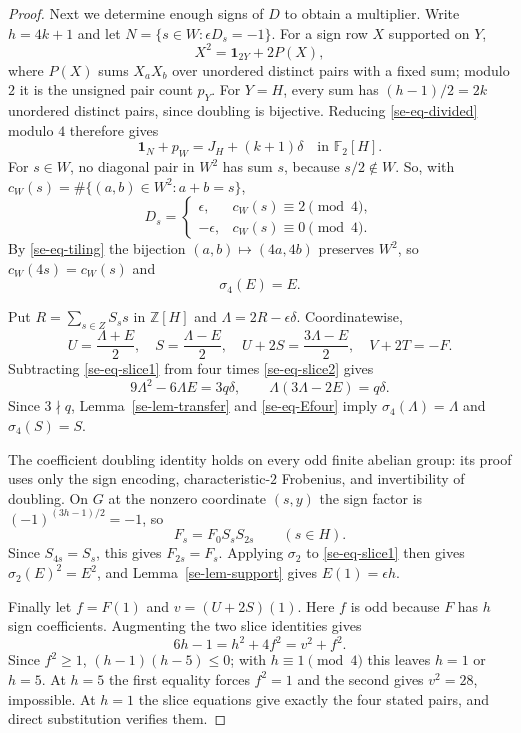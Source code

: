 \documentclass[11pt]{article}
\theoremstyle{definition}
\theoremstyle{remark}
\begin{document}
\begin{proof}
Next we determine enough signs of $D$ to obtain a multiplier.  Write
$h=4k+1$ and let $N=\{s\in W:\epsilon D_s=-1\}$.  For a sign row $X$
supported on $Y$,
\[
 X^2=\mathbf1_{2Y}+2P(X),
\]
where $P(X)$ sums $X_aX_b$ over unordered distinct pairs with a fixed
sum; modulo $2$ it is the unsigned pair count $p_Y$.
For $Y=H$, every sum has $(h-1)/2=2k$ unordered distinct pairs, since
doubling is bijective.  Reducing \eqref{se-eq-divided} modulo $4$
therefore gives
\begin{equation}
 \mathbf1_N+p_W=J_H+(k+1)\delta
       \quad\text{in }\mathbb F_2[H].
 \label{se-eq-signrule}
\end{equation}
For $s\in W$, no diagonal pair in $W^2$ has sum $s$, because
$s/2\notin W$.  So, with
$c_W(s)=\#\{(a,b)\in W^2:a+b=s\}$,
\[
 D_s=\begin{cases}
 \epsilon,&c_W(s)\equiv2\pmod4,\\
 -\epsilon,&c_W(s)\equiv0\pmod4.
 \end{cases}
\]
By \eqref{se-eq-tiling} the bijection $(a,b)\mapsto(4a,4b)$ preserves
$W^2$, so $c_W(4s)=c_W(s)$ and
\begin{equation}
 \sigma_4(E)=E.
 \label{se-eq-Efour}
\end{equation}

Put $R=\sum_{s\in Z}S_s s$ in $\mathbb Z[H]$ and
$\Lambda=2R-\epsilon\delta$.  Coordinatewise,
\[
 U=\frac{\Lambda+E}{2},\quad
 S=\frac{\Lambda-E}{2},\quad
 U+2S=\frac{3\Lambda-E}{2},\quad V+2T=-F.
\]
Subtracting \eqref{se-eq-slice1} from four times
\eqref{se-eq-slice2} gives
\[
 9\Lambda^2-6\Lambda E=3q\delta,
 \qquad\Lambda(3\Lambda-2E)=q\delta.
\]
Since $3\nmid q$, Lemma~\ref{se-lem-transfer} and
\eqref{se-eq-Efour} imply $\sigma_4(\Lambda)=\Lambda$ and
$\sigma_4(S)=S$.

The coefficient doubling identity holds on every odd finite abelian
group: its proof uses only the sign encoding, characteristic-$2$
Frobenius, and invertibility of doubling.  On $G$ at the nonzero
coordinate $(s,y)$ the sign factor is $(-1)^{(3h-1)/2}=-1$, so
\[
 F_s=F_0S_sS_{2s}\qquad(s\in H).
\]
Since $S_{4s}=S_s$, this gives $F_{2s}=F_s$.  Applying $\sigma_2$ to
\eqref{se-eq-slice1} then gives $\sigma_2(E)^2=E^2$, and
Lemma~\ref{se-lem-support} gives $E(1)=\epsilon h$.

Finally let $f=F(1)$ and $v=(U+2S)(1)$.  Here $f$ is odd because $F$
has $h$ sign coefficients.  Augmenting the two slice identities gives
\[
 6h-1=h^2+4f^2=v^2+f^2.
\]
Since $f^2\ge1$, $(h-1)(h-5)\le0$; with $h\equiv1\pmod4$ this leaves
$h=1$ or $h=5$.  At $h=5$ the first equality forces $f^2=1$ and the
second gives $v^2=28$, impossible.  At $h=1$ the slice equations give
exactly the four stated pairs, and direct substitution verifies them.
\end{proof}
\end{document}
